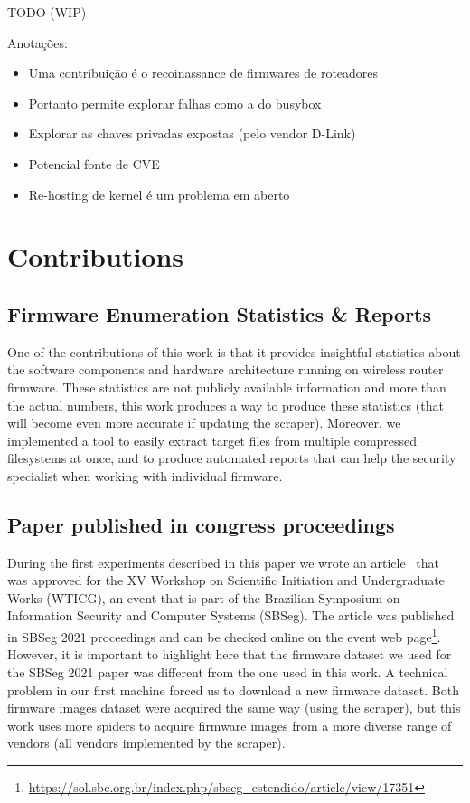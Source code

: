 TODO (WIP)

Anotações:
\begin{itemize}

    \item Uma contribuição é o recoinassance de firmwares de roteadores
    \item Portanto permite explorar falhas como a do busybox
    \item Explorar as chaves privadas expostas (pelo vendor D-Link)
    \item Potencial fonte de CVE
    \item Re-hosting de kernel é um problema em aberto
    
\end{itemize}

\section{Contributions}

\subsection{Firmware Enumeration Statistics \& Reports}
One of the contributions of this work is that it provides insightful statistics about the software components and hardware architecture running on wireless router firmware. These statistics are not publicly available information and more than the actual numbers, this work produces a way to produce these statistics (that will become even more accurate if updating the scraper). Moreover, we implemented a tool to easily extract target files from multiple compressed filesystems at once, and to produce automated reports that can help the security specialist when working with individual firmware.

\subsection{Paper published in congress proceedings}
During the first experiments described in this paper we wrote an article~\cite{sbseg2021} that was approved for the XV Workshop on Scientific Initiation and Undergraduate Works (WTICG), an event that is part of the Brazilian Symposium on Information Security and Computer Systems (SBSeg). The article was published in SBSeg 2021 proceedings and can be checked online on the event web page\footnote{\url{https://sol.sbc.org.br/index.php/sbseg_estendido/article/view/17351}}. However, it is important to highlight here that the firmware dataset we used for the SBSeg 2021 paper was different from the one used in this work. A technical problem in our first machine forced us to download a new firmware dataset. Both firmware images dataset were acquired the same way (using the scraper), but this work uses more spiders to acquire firmware images from a more diverse range of vendors (all vendors implemented by the scraper).

